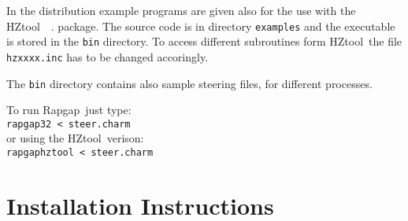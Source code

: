\documentclass[10pt]{article} \usepackage{dina4}
\def\RAPGAP{{\sc Rapgap}}
\def\HZTOOL{{\sc HZtool}}
\begin{document}
In the distribution example programs are given also for the use with the 
\HZTOOL\ ~\cite{hztool2006}.
package. The source code is in directory {\tt examples} and the executable is
stored in the {\tt bin} directory. To access different subroutines form 
\HZTOOL\,
the file {\tt hzxxxx.inc} has to be changed accoringly.

The {\tt bin} directory contains also sample steering files, for different
processes.

To run \RAPGAP\ just type: \\
{\tt rapgap32 < steer.charm }\\
or using the \HZTOOL\ verison: \\
{\tt rapgaphztool < steer.charm }

\section{Installation Instructions}
\end{document}
